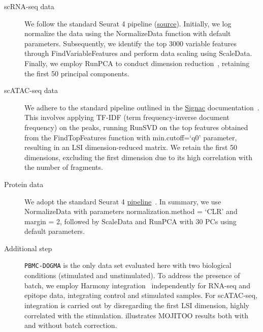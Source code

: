 \begin{description}
    \item[scRNA-seq data]
    We follow the standard Seurat 4 pipeline (\href{https://satijalab.org/seurat/articles/pbmc3k_tutorial.html}{source}). Initially, we log normalize the data using the NormalizeData function with default parameters. Subsequently, we identify the top 3000 variable features through FindVariableFeatures and perform data scaling using ScaleData. Finally, we employ RunPCA to conduct dimension reduction~\citep{hao2021seurat4}, retaining the first 50 principal components.
    
    \item[scATAC-seq data]
    We adhere to the standard pipeline outlined in the \href{https://satijalab.org/signac/articles/pbmc_vignette.html}{Signac} documentation~\citep{signac}. This involves applying TF-IDF (term frequency-inverse document frequency) on the peaks, running RunSVD on the top features obtained from the FindTopFeatures function with min.cutoff=`q0' parameter, resulting in an LSI dimension-reduced matrix. We retain the first 50 dimensions, excluding the first dimension due to its high correlation with the number of fragments.  
    
    \item[Protein data]
    We adopt the standard Seurat 4 \href{https://satijalab.org/seurat/articles/multimodal_vignette.html}{pipeline}~\citep{hao2021seurat4}. In summary, we use NormalizeData with parameters normalization.method = `CLR' and margin = 2, followed by ScaleData and RunPCA with 30 PCs using default parameters.
    
    \item[Additional step] 
    \texttt{PBMC-DOGMA} is the only data set evaluated here with two biological conditions (stimulated and unstimulated). To address the presence of batch, we employ Harmony integration~\citep{korsunsky2019harmony} independently for RNA-seq and epitope data, integrating control and stimulated samples. For scATAC-seq, integration is carried out by disregarding the first LSI dimension, highly correlated with the stimulation.  illustrates MOJITOO results both with and without batch correction.
\end{description}

